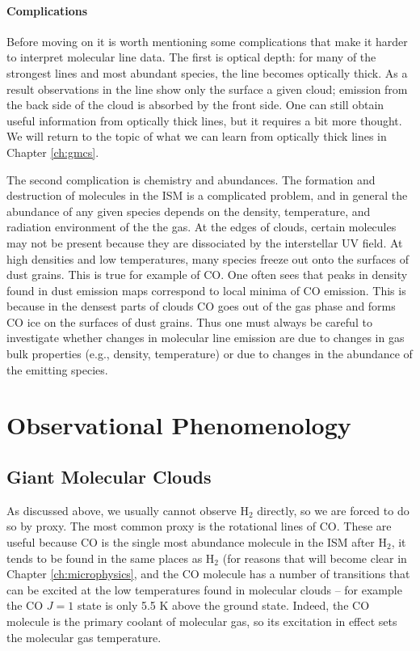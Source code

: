 \paragraph{Complications}

Before moving on it is worth mentioning some complications that make it harder to interpret molecular line data. The first is optical depth: for many of the strongest lines and most abundant species, the line becomes optically thick. As a result observations in the line show only the surface a given cloud; emission from the back side of the cloud is absorbed by the front side. One can still obtain useful information from optically thick lines, but it requires a bit more thought. We will return to the topic of what we can learn from optically thick lines in Chapter \ref{ch:gmcs}.

The second complication is chemistry and abundances. The formation and destruction of molecules in the ISM is a complicated problem, and in general the abundance of any given species depends on the density, temperature, and radiation environment of the the gas. At the edges of clouds, certain molecules may not be present because they are dissociated by the interstellar UV field. At high densities and low temperatures, many species freeze out onto the surfaces of dust grains. This is true for example of CO. One often sees that peaks in density found in dust emission maps correspond to local minima of CO emission. This is because in the densest parts of clouds CO goes out of the gas phase and forms CO ice on the surfaces of dust grains.  Thus one must always be careful to investigate whether changes in molecular line emission are due to changes in gas bulk properties (e.g., density, temperature) or due to changes in the abundance of the emitting species.


\section{Observational Phenomenology}

\subsection{Giant Molecular Clouds}

As discussed above, we usually cannot observe H$_2$ directly, so we are forced to do so by proxy. The most common proxy is the rotational lines of CO. These are useful because CO is the single most abundance molecule in the ISM after H$_2$, it tends to be found in the same places as H$_2$ (for reasons that will become clear in Chapter \ref{ch:microphysics}, and the CO molecule has a number of transitions that can be excited at the low temperatures found in molecular clouds -- for example the CO $J=1$ state is only 5.5 K above the ground state. Indeed, the CO molecule is the primary coolant of molecular gas, so its excitation in effect sets the molecular gas temperature. 

